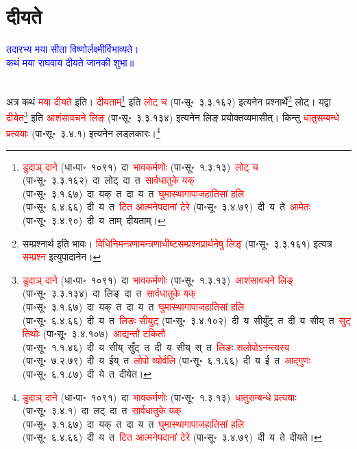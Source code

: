 \section[दीयते]{दीयते}
\centering\textcolor{blue}{तदारभ्य मया सीता विष्णोर्लक्ष्मीर्विभाव्यते।\nopagebreak\\
कथं मया राघवाय दीयते जानकी शुभा॥}\nopagebreak\\
\\
\fontsize{14}{21}\selectfont\begin{sloppypar}\justifying\noindent\hspace{10mm} अत्र कथं \textcolor{red}{मया दीयते} इति। \textcolor{red}{दीयताम्}\footnote{\textcolor{red}{डुदाञ् दाने} (धा॰पा॰~१०९१)~\arrow दा~\arrow \textcolor{red}{भावकर्मणोः} (पा॰सू॰~१.३.१३)~\arrow \textcolor{red}{लोट् च} (पा॰सू॰~३.३.१६२)~\arrow दा~लोट्~\arrow दा~त~\arrow \textcolor{red}{सार्वधातुके यक्} (पा॰सू॰~३.१.६७)~\arrow दा~यक्~त~\arrow दा~य~त~\arrow \textcolor{red}{घुमा\-स्थागापा\-जहातिसां हलि} (पा॰सू॰~६.४.६६)~\arrow दी~य~त~\arrow \textcolor{red}{टित आत्मनेपदानां टेरे} (पा॰सू॰~३.४.७९)~\arrow दी~य~ते~\arrow \textcolor{red}{आमेतः} (पा॰सू॰~३.४.९०)~\arrow दी~य~ताम्~\arrow दीयताम्।} इति \textcolor{red}{लोट् च} (पा॰सू॰~३.३.१६२) इत्यनेन प्रश्नार्थे\footnote{सम्प्रश्नार्थ इति भावः। \textcolor{red}{विधि\-निमन्‍त्रणामन्‍त्रणाधीष्‍ट\-सम्प्रश्न\-प्रार्थनेषु लिङ्} (पा॰सू॰~३.३.१६१) इत्यत्र \textcolor{red}{सम्प्रश्न} इत्युपादानेन।} लोट्। यद्वा \textcolor{red}{दीयेत}\footnote{\textcolor{red}{डुदाञ् दाने} (धा॰पा॰~१०९१)~\arrow दा~\arrow \textcolor{red}{भावकर्मणोः} (पा॰सू॰~१.३.१३)~\arrow \textcolor{red}{आशंसावचने लिङ्} (पा॰सू॰~३.३.१३४)~\arrow दा~लिङ्~\arrow दा~त~\arrow \textcolor{red}{सार्वधातुके यक्} (पा॰सू॰~३.१.६७)~\arrow दा~यक्~त~\arrow दा~य~त~\arrow \textcolor{red}{घुमा\-स्थागापा\-जहातिसां हलि} (पा॰सू॰~६.४.६६)~\arrow दी~य~त~\arrow \textcolor{red}{लिङः सीयुट्} (पा॰सू॰~३.४.१०२)~\arrow दी~य~सीयुँट्~त~\arrow दी~य~सीय्~त~\arrow \textcolor{red}{सुट् तिथोः} (पा॰सू॰~३.४.१०७)~\arrow \textcolor{red}{आद्यन्तौ टकितौ} (पा॰सू॰~१.१.४६)~\arrow दी~य~सीय्~सुँट्~त~\arrow दी~य~सीय्~स्~त~\arrow \textcolor{red}{लिङः सलोपोऽनन्त्यस्य} (पा॰सू॰~७.२.७९)~\arrow दी~य~ईय्~त~\arrow \textcolor{red}{लोपो व्योर्वलि} (पा॰सू॰~६.१.६६)~\arrow दी~य~ई~त~\arrow \textcolor{red}{आद्गुणः} (पा॰सू॰~६.१.८७)~\arrow दी~ये~त~\arrow दीयेत।} इति \textcolor{red}{आशंसावचने लिङ्} (पा॰सू॰~३.३.१३४) इत्यनेन लिङ् प्रयोक्तव्यमासीत्। किन्तु \textcolor{red}{धातु\-सम्बन्धे प्रत्ययाः} (पा॰सू॰~३.४.१) इत्यनेन लड्लकारः।\footnote{\textcolor{red}{डुदाञ् दाने} (धा॰पा॰~१०९१)~\arrow दा~\arrow \textcolor{red}{भावकर्मणोः} (पा॰सू॰~१.३.१३)~\arrow \textcolor{red}{धातुसम्बन्धे प्रत्ययाः} (पा॰सू॰~३.४.१)~\arrow दा~लट्~\arrow दा~त~\arrow \textcolor{red}{सार्वधातुके यक्} (पा॰सू॰~३.१.६७)~\arrow दा~यक्~त~\arrow दा~य~त~\arrow \textcolor{red}{घुमा\-स्थागापा\-जहातिसां हलि} (पा॰सू॰~६.४.६६)~\arrow दी~य~त~\arrow \textcolor{red}{टित आत्मनेपदानां टेरे} (पा॰सू॰~३.४.७९)~\arrow दी~य~ते~\arrow दीयते।}\end{sloppypar}
